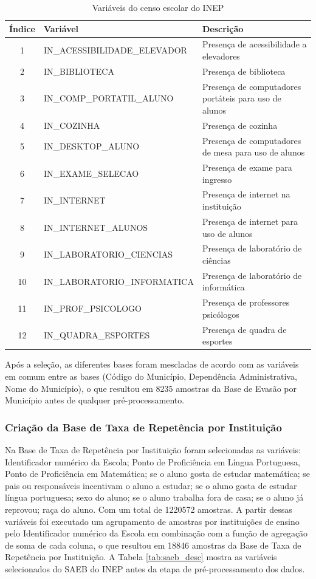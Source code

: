 \documentclass[english, spanish, brazilian]{RBIEarticle} %
\begin{document}
 \begin{table}[H]
\centering
\begin{tabular}{clp{7cm}}
\hline
\textbf{Índice} & \textbf{Variável} & \textbf{Descrição} \\ 
\hline
1  & IN\_ACESSIBILIDADE\_ELEVADOR  & Presença de acessibilidade a elevadores \\
2  & IN\_BIBLIOTECA                & Presença de biblioteca \\
3  & IN\_COMP\_PORTATIL\_ALUNO     & Presença de computadores portáteis para uso de alunos \\
4  & IN\_COZINHA                   & Presença de cozinha  \\
5  & IN\_DESKTOP\_ALUNO            & Presença de computadores de mesa para uso de alunos  \\
6 & IN\_EXAME\_SELECAO            & Presença de exame para ingresso  \\
7 & IN\_INTERNET                  & Presença de internet na instituição  \\
8 & IN\_INTERNET\_ALUNOS          & Presença de internet para uso de alunos  \\
9 & IN\_LABORATORIO\_CIENCIAS     & Presença de laboratório de ciências  \\
10 & IN\_LABORATORIO\_INFORMATICA  & Presença de laboratório de informática  \\
11 & IN\_PROF\_PSICOLOGO           & Presença de professores psicólogos  \\
12 & IN\_QUADRA\_ESPORTES          & Presença de quadra de esportes  \\
\hline
\end{tabular}
\caption{Variáveis do censo escolar do INEP}
\label{tab:var_censo_desc}
\end{table} 

Após a seleção, as diferentes bases foram mescladas de acordo com as variáveis em comum entre as bases (Código do Município, Dependência Administrativa, Nome do Município), o que resultou em 8235 amostras da Base de Evasão por Município antes de qualquer pré-processamento.




\subsubsection{Criação da Base de Taxa de Repetência por Instituição}
\label{sec:cr_base_saeb}
Na Base de Taxa de Repetência por Instituição foram selecionadas as variáveis: Identificador numérico da Escola; Ponto de Proficiência em Língua Portuguesa, Ponto de Proficiência em Matemática; se o aluno gosta de estudar matemática; se pais ou responsáveis incentivam o aluno a estudar; se o aluno gosta de estudar língua portuguesa; sexo do aluno; se o aluno trabalha fora de casa; se o aluno já reprovou; raça do aluno. Com um total de 1220572 amostras. A partir dessas variáveis foi executado um agrupamento de amostras por instituições de ensino pelo Identificador numérico da Escola em combinação com a função de agregação de soma de cada coluna, o que resultou em 18846 amostras da Base de Taxa de Repetência por Instituição. A Tabela \ref{tab:saeb_desc} mostra as variáveis selecionados do SAEB do INEP antes da etapa de pré-processamento dos dados.
\end{document}
